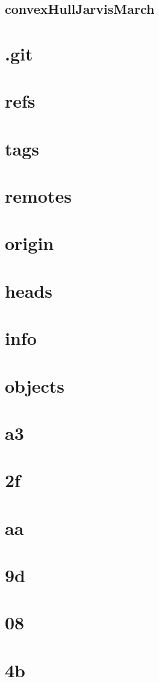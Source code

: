 \documentclass{article}
\begin{document}
\subsection{convexHullJarvisMarch}


\section{.git}
\section{refs}
\section{tags}
\section{remotes}
\section{origin}
\section{heads}
\section{info}
\section{objects}
\section{a3}
\section{2f}
\section{aa}
\section{9d}
\section{08}
\section{4b}
\end{document}

